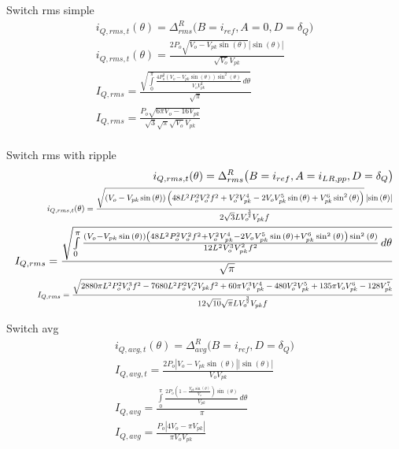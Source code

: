 \documentclass[12pt]{report}
\begin{document}
Switch rms simple
\begin{align}
i_{Q,rms,t}(\theta) = \Delta^R_{rms} \big(B=i_{ref}, A=0, D=\delta_{Q} \big)\\
i_{Q,rms,t}(\theta) = \frac{2 P_{o} \sqrt{V_{o} - V_{pk} \sin{\left(\theta \right)}} \left|{\sin{\left(\theta \right)}}\right|}{\sqrt{V_{o}} V_{pk}}\\
I_{Q,rms} = \frac{\sqrt{\int\limits_{0}^{\pi} \frac{4 P_{o}^{2} \left(V_{o} - V_{pk} \sin{\left(\theta \right)}\right) \sin^{2}{\left(\theta \right)}}{V_{o} V_{pk}^{2}}\, d\theta}}{\sqrt{\pi}}\\
I_{Q,rms} = \frac{P_{o} \sqrt{6 \pi V_{o} - 16 V_{pk}}}{\sqrt{3} \sqrt{\pi} \sqrt{V_{o}} V_{pk}}\\
\end{align}

Switch rms with ripple
\begin{align}
i_{Q,rms,t}(\theta) = \Delta^R_{rms} \big(B=i_{ref},A=i_{LR,pp},D=\delta_{Q} \big)\\
\text{\scalebox{0.75}{$i_{Q,rms,t}(\theta) = \frac{\sqrt{\left(V_{o} - V_{pk} \sin{\left(\theta \right)}\right) \left(48 L^{2} P_{o}^{2} V_{o}^{2} f^{2} + V_{o}^{2} V_{pk}^{4} - 2 V_{o} V_{pk}^{5} \sin{\left(\theta \right)} + V_{pk}^{6} \sin^{2}{\left(\theta \right)}\right)} \left|{\sin{\left(\theta \right)}}\right|}{2 \sqrt{3} L V_{o}^{\frac{3}{2}} V_{pk} f}$}}\\
I_{Q,rms} = \frac{\sqrt{\int\limits_{0}^{\pi} \frac{\left(V_{o} - V_{pk} \sin{\left(\theta \right)}\right) \left(48 L^{2} P_{o}^{2} V_{o}^{2} f^{2} + V_{o}^{2} V_{pk}^{4} - 2 V_{o} V_{pk}^{5} \sin{\left(\theta \right)} + V_{pk}^{6} \sin^{2}{\left(\theta \right)}\right) \sin^{2}{\left(\theta \right)}}{12 L^{2} V_{o}^{3} V_{pk}^{2} f^{2}}\, d\theta}}{\sqrt{\pi}}\\
\text{\scalebox{0.75}{$I_{Q,rms} = \frac{\sqrt{2880 \pi L^{2} P_{o}^{2} V_{o}^{3} f^{2} - 7680 L^{2} P_{o}^{2} V_{o}^{2} V_{pk} f^{2} + 60 \pi V_{o}^{3} V_{pk}^{4} - 480 V_{o}^{2} V_{pk}^{5} + 135 \pi V_{o} V_{pk}^{6} - 128 V_{pk}^{7}}}{12 \sqrt{10} \sqrt{\pi} L V_{o}^{\frac{3}{2}} V_{pk} f}$}}\\
\end{align}

Switch avg
\begin{align}
i_{Q,avg,t}(\theta) = \Delta^R_{avg} \big(B=i_{ref}, D=\delta_{Q} \big)\\
I_{Q,avg,t} = \frac{2 P_{o} \left|{V_{o} - V_{pk} \sin{\left(\theta \right)}}\right| \left|{\sin{\left(\theta \right)}}\right|}{V_{o} V_{pk}}\\
I_{Q,avg} = \frac{\int\limits_{0}^{\pi} \frac{2 P_{o} \left(1 - \frac{V_{pk} \sin{\left(\theta \right)}}{V_{o}}\right) \sin{\left(\theta \right)}}{V_{pk}}\, d\theta}{\pi}\\
I_{Q,avg} = \frac{P_{o} \left|{4 V_{o} - \pi V_{pk}}\right|}{\pi V_{o} V_{pk}}\\
\end{align}
\end{document}
